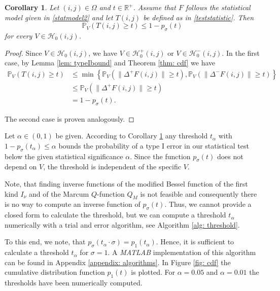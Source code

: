 \documentclass[a4paper,12pt]{article}
\newcommand{\norm}[1]{\lVert#1\rVert}
\theoremstyle{plain}
\newtheorem{corollary}[theorem]{Corollary}
\theoremstyle{definition}
\begin{document}
\begin{corollary}\label{cor: typeIbound}
	Let $(i, j) \in \Omega$ and $t \in \mathbb{R}^+$. Assume that $F$ follows the statistical model given in \eqref{statmodel2} and let $T(i, j)$ be defined as in \eqref{teststatistic}. Then
	\begin{equation}
		\mathbb{P}_V( T(i, j) \geq t ) \leq 1 - p_\sigma(t)
	\end{equation}
	for every $V \in \mathcal{H}_0(i, j)$.
\end{corollary}
\begin{proof}
	Since $V \in \mathcal{H}_0(i, j)$, we have $V \in \mathcal{H}_0^+(i, j)$ or $V \in \mathcal{H}_0^-(i, j)$. In the first case, by Lemma \ref{lem: typeIbound} and Theorem \ref{thm: cdf} we have
	\begin{align*}
		\mathbb{P}_V( T(i, j) \geq t ) &\leq \min \left\{ \mathbb{P}_V( \norm{\Delta^+ F(i, j)} \geq t ), \mathbb{P}_V( \norm{\Delta^- F(i, j)} \geq t ) \right\} \\
		&\leq \mathbb{P}_V( \norm{\Delta^+ F(i, j)} \geq t ) \\
		&= 1 - p_\sigma(t).
	\end{align*}
	
	The second case is proven analogously.
\end{proof}

Let $\alpha \in (0, 1)$ be given. According to Corollary \ref{cor: typeIbound} any threshold $t_\alpha$ with $1 - p_\sigma(t_\alpha) \leq \alpha$ bounds the probability of a type I error in our statistical test below the given statistical significance $\alpha$. Since the function $p_\sigma(t)$ does not depend on $V$, the threshold is independent of the specific $V$.

Note, that finding inverse functions of the modified Bessel function of the first kind $I_\nu$ and of the Marcum $Q$-function $Q_M$ is not feasible and consequently there is no way to compute an inverse function of $p_\sigma(t)$. Thus, we cannot provide a closed form to calculate the threshold, but we can compute a threshold $t_\alpha$ numerically with a trial and error algorithm, see Algorithm \ref{alg: threshold}.

To this end, we note, that $p_\sigma(t_\alpha \cdot \sigma) = p_1(t_\alpha)$. Hence, it is sufficient to calculate a threshold $t_\alpha$ for $\sigma = 1$. A \emph{MATLAB} implementation of this algorithm can be found in Appendix \ref{appendix: algorithms}. In Figure \ref{fig: cdf} the cumulative distribution function $p_1(t)$ is plotted. For $\alpha = 0.05$ and $\alpha = 0.01$ the thresholds have been numerically computed.\\
\end{document}
